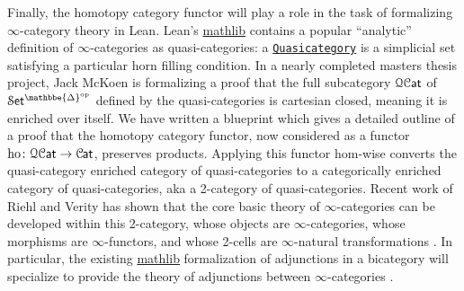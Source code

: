 \documentclass[a4paper,UKenglish,cleveref, autoref, thm-restate]{lipics-v2021}
\newcommand{\op}{\textup{op}}
\newcommand{\ho}{\textup{ho}}
\newcommand{\cat}[1]{\textup{\textsf{#1}}}%
\newcommand{\1}{\mathbbe{1}}
\newcommand{\2}{\mathbbe{2}}
\newcommand{\3}{\mathbbe{3}}
\newcommand{\DDelta}{\mathbbe{\Delta}}
\newcommand{\Cat}{\mathcal{C}{\kern-.75pt}\cat{at}}
\newcommand{\Set}{\mathcal{S}\cat{et}}
\newcommand{\QCat}{\mathcal{QC}\cat{at}}
\newcommand{\libmathlib}{\href{https://github.com/leanprover-community/mathlib}{\textsf{mathlib}}}
\newcommand{\ldoc}[2][]{\href{https://leanprover-community.github.io/mathlib4_docs/find/?pattern=#1#2\#doc}{\texttt{#2}}}
\begin{document}
Finally, the homotopy category functor will play a role in the task of formalizing $\infty$-category theory in Lean. Lean's \libmathlib{} contains a popular ``analytic'' definition of $\infty$-categories as quasi-categories: a \ldoc[SSet.]{Quasicategory} is a simplicial set satisfying a particular horn filling condition. In a nearly completed masters thesis project, Jack McKoen is formalizing a proof that the full subcategory $\QCat$ of $\Set^{\DDelta^\op}$ defined by the quasi-categories is cartesian closed, meaning it is enriched over itself. We have written a blueprint which gives a detailed outline of a proof that the homotopy category functor, now considered as a functor $\ho \colon \QCat \to \Cat$, preserves products. Applying this functor hom-wise converts the quasi-category enriched category of quasi-categories to a categorically enriched category of quasi-categories, aka a 2-category of quasi-categories. Recent work of Riehl and Verity has shown that the core basic theory of $\infty$-categories can be developed within this 2-category, whose objects are $\infty$-categories, whose morphisms are $\infty$-functors, and whose 2-cells are $\infty$-natural transformations \cite{RiehlVerity:2022eo}. In particular, the existing \libmathlib{} formalization of adjunctions in a bicategory will specialize to provide the theory of adjunctions between $\infty$-categories \cite{InfinityCosmos}.






\end{document}
